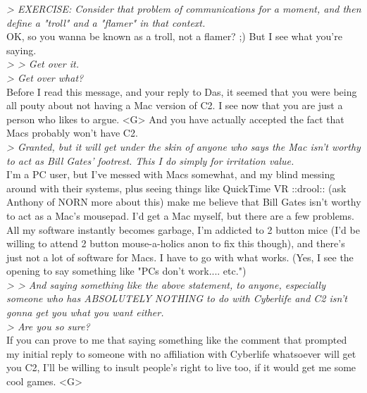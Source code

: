 \documentclass[11pt,twoside,a4paper]{article}
\begin{document}
\begin{multicols*}{2}
\emph{> EXERCISE: Consider that problem of communications for a moment, and then define a "troll" and a "flamer" in that context.}~\\

OK, so you wanna be known as a troll, not a flamer?  ;)  But I see what you're saying.~\\

\emph{> > Get over it.}~\\

\emph{> Get over what?}~\\

Before I read this message, and your reply to Das, it seemed that you were being all pouty about not having a Mac version of C2.  I see now that you are just a person who likes to argue.  <G>  And you have actually accepted the fact that Macs probably won't have C2.~\\

\emph{> Granted, but it will get under the skin of anyone who says the Mac isn't worthy to act as Bill Gates' footrest. This I do simply for irritation value.}~\\

I'm a PC user, but I've messed with Macs somewhat, and my blind messing around with their systems, plus seeing things like QuickTime VR ::drool:: (ask Anthony of NORN more about this) make me believe that Bill Gates isn't worthy to act as a Mac's mousepad.  I'd get a Mac myself, but there are a few problems.  All my software instantly becomes garbage, I'm addicted to 2 button mice (I'd be willing to attend 2 button mouse-a-holics anon to fix this though), and there's just not a lot of software for Macs.  I have to go with what works.  (Yes, I see the opening to say something like "PCs don't work.... etc.")~\\

\emph{> > And saying something like the above statement, to anyone, especially someone who has ABSOLUTELY NOTHING to do with Cyberlife and C2 isn't gonna get you what you want either.}~\\

\emph{> Are you so sure?}~\\

If you can prove to me that saying something like the comment that prompted my initial reply to someone with no affiliation with Cyberlife whatsoever will get you C2, I'll be willing to insult people's right to live too, if it would get me some cool games.  <G>~\\


\end{multicols*}
\end{document}
